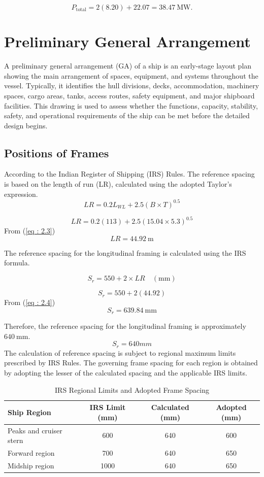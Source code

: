 \documentclass[12pt,a4paper,twoside]{report}
\begin{document}
\[
P_{\mathrm{total}}
=
2(8.20) + 22.07
=
38.47~\mathrm{MW}.
\]
\section{Preliminary General Arrangement}
A preliminary general arrangement (GA) of a ship is an early-stage layout plan showing the main arrangement of spaces, equipment, and systems throughout the vessel. Typically, it identifies the hull divisions, decks, accommodation, machinery spaces, cargo areas, tanks, access routes, safety equipment, and major shipboard facilities. This drawing is used to assess whether the functions, capacity, stability, safety, and operational requirements of the ship can be met before the detailed design begins.
\subsection{Positions of Frames}According to the Indian Register of Shipping (IRS) Rules. The reference spacing is based on the length of run (LR), calculated using the adopted Taylor’s expression.
\begin{equation}
LR = 0.2L_{WL} + 2.5(B \times T)^{0.5}
\label{eq : 2.3}
\end{equation}

\[
LR = 0.2(113) + 2.5(15.04 \times 5.3)^{0.5}
\]
From (\ref{eq : 2.3})
\[
LR = 44.92~\mathrm{m}
\]

The reference spacing for the longitudinal framing is calculated using
the IRS formula.

\begin{equation}
S_r = 550 + 2 \times LR \quad (\mathrm{mm})
\label{eq : 2.4}
\end{equation}

\[
S_r = 550 + 2(44.92)
\]
From (\ref{eq : 2.4})
\[
S_r = 639.84~\mathrm{mm}
\]

Therefore, the reference spacing for the longitudinal framing is
approximately $640~\mathrm{mm}$.
$$S_r=640mm$$
The calculation of reference spacing is subject to regional maximum limits prescribed by IRS Rules. The governing frame spacing for each region is obtained by adopting the lesser of the calculated spacing and the applicable IRS limits.

\begin{table}[htbp]
    \centering
    \caption{IRS Regional Limits and Adopted Frame Spacing}
    \label{tab:irs_frame_spacing}

    \small
    \setlength{\tabcolsep}{4pt}

    \begin{tabular}{lccc}
        \toprule
        \textbf{Ship Region} &
        \textbf{IRS Limit (mm)} &
        \textbf{Calculated (mm)} &
        \textbf{Adopted (mm)} \\
        \midrule

        Peaks and cruiser stern & 600  & 640 & 600 \\
        Forward region         & 700  & 640 & 650 \\
        Midship region         & 1000 & 640 & 650 \\

        \bottomrule
    \end{tabular}
\end{table}
\end{document}
